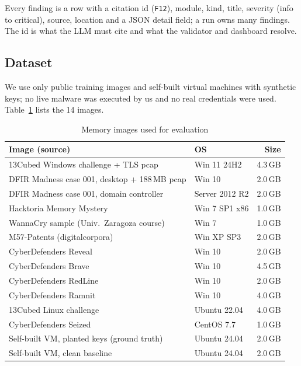 Every finding is a row with a citation id (\texttt{F12}), module, kind, title, severity (info to critical),
source, location and a JSON detail field; a run owns many findings. The id is what the LLM must cite and what
the validator and dashboard resolve.

\subsection{Dataset}
We use only public training images and self-built virtual machines with synthetic keys; no live malware was
executed by us and no real credentials were used. Table~\ref{tab:data} lists the 14 images.

\begin{table}[t]
\centering
\caption{Memory images used for evaluation}
\label{tab:data}
\footnotesize
\setlength{\tabcolsep}{3pt}
\begin{tabularx}{\columnwidth}{@{}Xlr@{}}
\toprule
Image (source) & OS & Size\\
\midrule
13Cubed Windows challenge + TLS pcap & Win 11 24H2 & 4.3\,GB\\
DFIR Madness case 001, desktop + 188\,MB pcap & Win 10 & 2.0\,GB\\
DFIR Madness case 001, domain controller & Server 2012 R2 & 2.0\,GB\\
Hacktoria Memory Mystery & Win 7 SP1 x86 & 1.0\,GB\\
WannaCry sample (Univ.\ Zaragoza course) & Win 7 & 1.0\,GB\\
M57-Patents (digitalcorpora) & Win XP SP3 & 2.0\,GB\\
CyberDefenders Reveal & Win 10 & 2.0\,GB\\
CyberDefenders Brave & Win 10 & 4.5\,GB\\
CyberDefenders RedLine & Win 10 & 2.0\,GB\\
CyberDefenders Ramnit & Win 10 & 4.0\,GB\\
13Cubed Linux challenge & Ubuntu 22.04 & 4.0\,GB\\
CyberDefenders Seized & CentOS 7.7 & 1.0\,GB\\
Self-built VM, planted keys (ground truth) & Ubuntu 24.04 & 2.0\,GB\\
Self-built VM, clean baseline & Ubuntu 24.04 & 2.0\,GB\\
\bottomrule
\end{tabularx}
\end{table}


